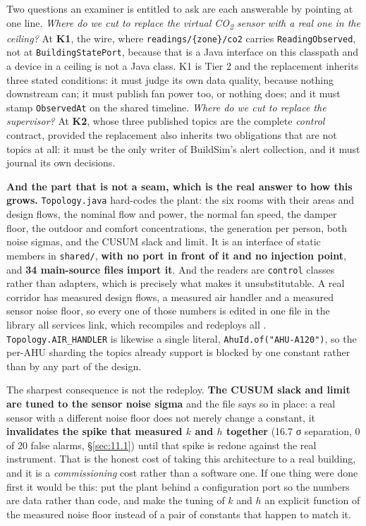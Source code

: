 Two questions an examiner is entitled to ask are each answerable by pointing at one line.
\emph{Where do we cut to replace the virtual CO\textsubscript{2} sensor with a real one in the
ceiling?} At \textbf{K1}, the wire, where \texttt{readings/\{zone\}/co2} carries
\texttt{ReadingObserved}, not at \texttt{BuildingStatePort}, because that is a Java interface on
this classpath and a device in a ceiling is not a Java class. K1 is Tier 2 and the replacement
inherits three stated conditions: it must judge its own data quality, because nothing downstream
can; it must publish fan power too, or nothing does; and it must stamp \texttt{ObservedAt} on the
shared timeline. \emph{Where do we cut to replace the supervisor?} At \textbf{K2}, whose three
published topics are the complete \emph{control} contract, provided the replacement also inherits
two obligations that are not topics at all: it must be the only writer of BuildSim's alert
collection, and it must journal its own decisions.

\textbf{And the part that is not a seam, which is the real answer to how this grows.}
\texttt{Topology.java} hard-codes the plant: the six rooms with their areas and design flows, the
nominal flow and power, the normal fan speed, the damper floor, the outdoor and comfort
concentrations, the generation per person, both noise sigmas, and the CUSUM slack and limit. It is
an interface of static members in \texttt{shared/}, \textbf{with no port in front of it and no
injection point}, and \textbf{34 main-source files import it}. And the readers are
\texttt{control} classes rather than adapters, which is precisely what makes it unsubstitutable.
A real corridor has measured design flows, a measured air handler and a measured sensor noise
floor, so every one of those numbers is edited in one file in the library all \factAuthoredServices{}
services link, which recompiles and redeploys all \factAuthoredServices{}. \texttt{Topology.AIR\_HANDLER} is likewise a single
literal, \texttt{AhuId.of("AHU-A120")}, so the per-AHU sharding the topics already support is
blocked by one constant rather than by any part of the design.

The sharpest consequence is not the redeploy. \textbf{The CUSUM slack and limit are tuned to the
sensor noise sigma} and the file says so in place: a real sensor with a different noise floor does
not merely change a constant, it \textbf{invalidates the spike that measured $k$ and $h$ together}
(16.7 σ separation, 0 of 20 false alarms, §\ref{sec:11.1}) until that spike is redone against the real
instrument. That is the honest cost of taking this architecture to a real building, and it is a
\emph{commissioning} cost rather than a software one. If one thing were done first it would be
this: put the plant behind a configuration port so the numbers are data rather than code, and make
the tuning of $k$ and $h$ an explicit function of the measured noise floor instead of a pair of
constants that happen to match it.\label{sec:4end}
